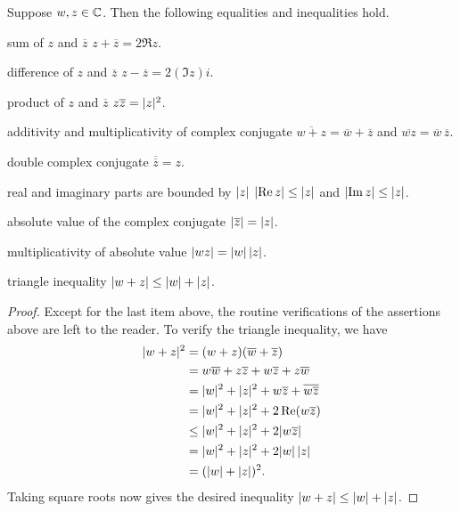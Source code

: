 \begin{result}\label{ax:4.4}
Suppose $w,z\in\mathbb{C}$. Then the following equalities and inequalities hold.
\begin{axprops}
\item[sum of $z$ and $\overline{z}$] $z+\overline{z}=2\Re z$.
\item[difference of $z$ and $\overline{z}$] $z-\overline{z}=2(\Im z)i$.
\item[product of $z$ and $\overline{z}$] $z\overline{z}=\lvert z \rvert^2$.
\item[additivity and multiplicativity of complex conjugate]
  $\overline{w+z}=\overline{w}+\overline{z}$ and
  $\overline{wz}=\overline{w}\,\overline{z}$.
\item[double complex conjugate] $\overline{\overline{z}}=z$.
\item[real and imaginary parts are bounded by $\abs{z}$]
  $\lvert \operatorname{Re} z \rvert\le\lvert z \rvert$ and $\lvert \operatorname{Im} z \rvert\le\lvert z \rvert$.
\item[absolute value of the complex conjugate]
  $\lvert \overline{z} \rvert=\lvert z \rvert$.
\item[multiplicativity of absolute value] $\lvert wz \rvert=\lvert w \rvert\,\lvert z \rvert$.
\item[triangle inequality] $\lvert w+z \rvert\le\lvert w \rvert+\lvert z \rvert$.
\end{axprops}
\end{result}

\begin{proof}
%
Except for the last item above, the routine verifications of the assertions
above are left to the reader. To verify the triangle inequality, we have
\begin{align*}
\lvert w+z \rvert^2 &= (w+z)(\overline{w}+\overline{z})\\
  &= w\overline{w}+z\overline{z}+w\overline{z}+z\overline{w}\\
  &= \lvert w \rvert^2+\lvert z \rvert^2+w\overline{z}+\overline{w\overline{z}}\\
  &= \lvert w \rvert^2+\lvert z \rvert^2+2\operatorname{Re}(w\overline{z})\\
  &\le \lvert w \rvert^2+\lvert z \rvert^2+2\lvert w\overline{z} \rvert\\
  &= \lvert w \rvert^2+\lvert z \rvert^2+2\lvert w \rvert\,\lvert z \rvert\\
  &= (\lvert w \rvert+\lvert z \rvert)^2.
\end{align*}
Taking square roots now gives the desired inequality
$\lvert w+z \rvert\le\lvert w \rvert+\lvert z \rvert$.
\end{proof}

